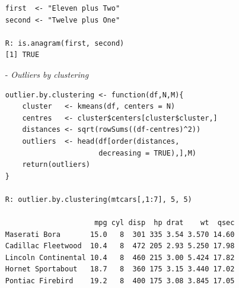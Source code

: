 \begin{itemize}
\begin{verbatim}
first  <- "Eleven plus Two"
second <- "Twelve plus One"

R: is.anagram(first, second) 
[1] TRUE
\end{verbatim}

 \item[-] \emph{Outliers by clustering}
\begin{verbatim}
outlier.by.clustering <- function(df,N,M){
    cluster   <- kmeans(df, centers = N)
    centres   <- cluster$centers[cluster$cluster,]
    distances <- sqrt(rowSums((df-centres)^2))
    outliers  <- head(df[order(distances, 
                      decreasing = TRUE),],M)
    return(outliers)
}

R: outlier.by.clustering(mtcars[,1:7], 5, 5)

                     mpg cyl disp  hp drat    wt  qsec
Maserati Bora       15.0   8  301 335 3.54 3.570 14.60
Cadillac Fleetwood  10.4   8  472 205 2.93 5.250 17.98
Lincoln Continental 10.4   8  460 215 3.00 5.424 17.82
Hornet Sportabout   18.7   8  360 175 3.15 3.440 17.02
Pontiac Firebird    19.2   8  400 175 3.08 3.845 17.05
\end{verbatim}

\end{itemize}

